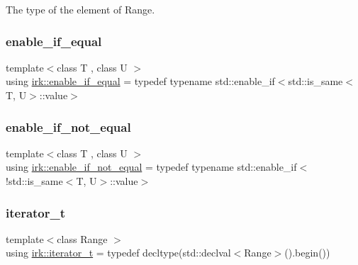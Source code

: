 The type of the element of Range. 

\mbox{\label{namespaceirk_a57b757ac14c20845b38f720c2ad8e822}} 
\subsubsection{\texorpdfstring{enable\+\_\+if\+\_\+equal}{enable\_if\_equal}}
{\footnotesize\ttfamily template$<$class T , class U $>$ \\
using \mbox{\hyperlink{namespaceirk_a57b757ac14c20845b38f720c2ad8e822}{irk\+::enable\+\_\+if\+\_\+equal}} = typedef typename std\+::enable\+\_\+if$<$std\+::is\+\_\+same$<$T, U$>$\+::value$>$}

\mbox{\label{namespaceirk_a9226be1b1d7748d4212d39b9513a2555}} 
\subsubsection{\texorpdfstring{enable\+\_\+if\+\_\+not\+\_\+equal}{enable\_if\_not\_equal}}
{\footnotesize\ttfamily template$<$class T , class U $>$ \\
using \mbox{\hyperlink{namespaceirk_a9226be1b1d7748d4212d39b9513a2555}{irk\+::enable\+\_\+if\+\_\+not\+\_\+equal}} = typedef typename std\+::enable\+\_\+if$<$!std\+::is\+\_\+same$<$T, U$>$\+::value$>$}

\mbox{\label{namespaceirk_a333e3104afd57c79fb0c18b90081520a}} 
\subsubsection{\texorpdfstring{iterator\+\_\+t}{iterator\_t}}
{\footnotesize\ttfamily template$<$class Range $>$ \\
using \mbox{\hyperlink{namespaceirk_a333e3104afd57c79fb0c18b90081520a}{irk\+::iterator\+\_\+t}} = typedef decltype(std\+::declval$<$Range$>$().begin())}

\mbox{\label{namespaceirk_a355b82a658f8685da29eca82444fed3c}} 
